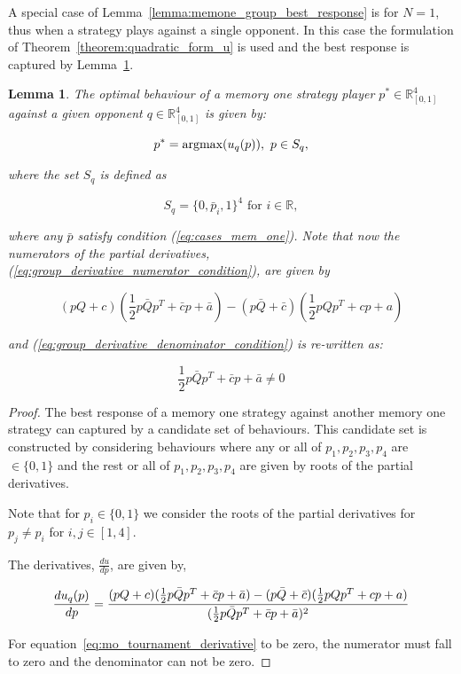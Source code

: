 \documentclass[10pt]{article}
\newcommand{\R}{\mathbb{R}}
\newtheorem{lemma}[theorem]{Lemma}
\begin{document}
A special case of Lemma~\ref{lemma:memone_group_best_response} is for \(N=1\),
thus when a strategy plays against a single opponent. In this case the formulation
of Theorem~\ref{theorem:quadratic_form_u} is used and the best response is captured
by Lemma~\ref{lemma:memone_best_response}.

\begin{lemma}\label{lemma:memone_best_response}
    The optimal behaviour of a memory one strategy player \(p^* \in \R_{[0, 1]} ^ 4\)
    against a given opponent \(q \in \R_{[0, 1]} ^ 4\) is given by:

    \[p^* = \textnormal{argmax}(u_q(p)), \ p \in S_q,\]

    where the set \(S_q\) is defined as

    \[S_q = \{0, \bar{p}_i, 1 \}^4 \text{ for } i \in \R,\]

    where any \(\bar{p}\) satisfy condition (\ref{eq:cases_mem_one}). Note that now
    the numerators of the partial derivatives, (\ref{eq:group_derivative_numerator_condition}),
    are given by

    {\small
    \begin{equation}\label{eq:derivative_numerator_condition}
        (pQ + c) ( \frac{1}{2} p  \bar{Q}  p^T + \bar{c}  p + \bar{a})
        - (p\bar{Q} + \bar{c})( \frac{1}{2} p  Q  p^T + c p + a)
    \end{equation}}

    and (\ref{eq:group_derivative_denominator_condition}) is re-written as:

    {\small
    \begin{equation}\label{eq:derivative_denominator_condition}
        \frac{1}{2} p  \bar{Q}  p^T + \bar{c}  p + \bar{a} \neq 0
    \end{equation}}
\end{lemma}

\begin{proof} The best response of a memory one strategy against another memory
    one strategy can captured by a candidate set of behaviours. This candidate
    set is constructed by considering behaviours where any or all of \(p_1, p_2, p_3, p_4\)
    are \(\in \{0, 1\}\) and the rest or all of \(p_1, p_2, p_3, p_4\) are given by
    roots of the partial derivatives.

    Note that for \(p_i \in \{0, 1\}\) we consider the roots of the partial derivatives
    for \(p_j \neq p_i\) for \(i,j \in [1, 4]\).

    The derivatives, \(\frac{du}{dp}\), are given by,

    \begin{equation}\label{eq:mo_derivative}
        \frac{du_q (p)}{dp}  = \frac{(pQ + c) ( \frac{1}{2} p  \bar{Q}  p^T + \bar{c}  p + \bar{a})
        - (p\bar{Q} + \bar{c})( \frac{1}{2} p  Q  p^T + c p + a)}
          {( \frac{1}{2} p  \bar{Q}  p^T + \bar{c}  p + \bar{a})^2} \\
    \end{equation}


    For equation~\ref{eq:mo_tournament_derivative} to be zero, the numerator must fall
    to zero and the denominator can not be zero.
\end{proof}
\end{document}
